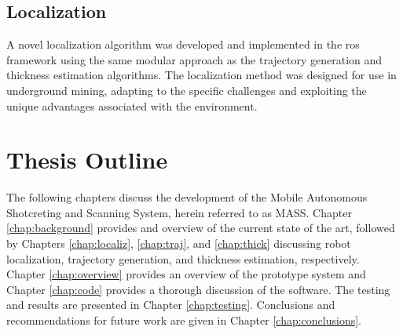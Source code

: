 \subsection{Localization}
A novel localization algorithm was developed and implemented in the \acrshort{ros} framework using the same modular approach as the trajectory generation and thickness estimation algorithms. The localization method was designed for use in underground mining, adapting to the specific challenges and exploiting the unique advantages associated with the environment.\\

\section{Thesis Outline}
\label{sec:outline}

The following chapters discuss the development of the Mobile Autonomous Shotcreting and Scanning System, herein referred to as MASS. Chapter \ref{chap:background} provides and overview of the current state of the art, followed by Chapters \ref{chap:localiz}, \ref{chap:traj}, and \ref{chap:thick} discussing robot localization, trajectory generation, and thickness estimation, respectively. Chapter \ref{chap:overview} provides an overview of the prototype system and Chapter \ref{chap:code} provides a thorough discussion of the software. The testing and results are presented in Chapter \ref{chap:testing}. Conclusions and recommendations for future work are given in Chapter \ref{chap:conclusions}.\\